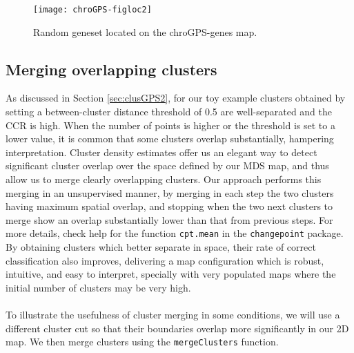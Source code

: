 \documentclass[a4paper,12pt,nogin]{article}
\newcommand{\newtext}[1]{{\color{blue} #1}} %
\begin{document}
\normalsize

\begin{figure}
\begin{center}
\texttt{[image: chroGPS-figloc2]}
 \end{center}
\caption{Random geneset located on the chroGPS-genes map.}
\label{fig:loc2}
\end{figure}

\subsection{Merging overlapping clusters}
\label{sec:clusGPS3}

\newtext{As discussed in Section \ref{sec:clusGPS2}, 
  for our toy example clusters obtained by setting a between-cluster distance threshold of 0.5 
  are well-separated and the CCR is high.
  When the number of points is higher or the threshold is set to a lower value, it is common
  that some clusters overlap substantially, hampering interpretation.}
Cluster density estimates offer
us an elegant way to detect significant cluster overlap over the space
defined by our MDS map, and thus allow us to merge clearly overlapping
clusters. Our approach performs this merging in an unsupervised
manner, by merging in each step the two clusters having maximum
spatial overlap, and stopping when the two next clusters to merge show
an overlap 
\newtext{substantially lower than that}
from previous steps. For more details, check help for the function
\texttt{cpt.mean} in the \texttt{changepoint} package. By obtaining
clusters which better separate in space, their rate of correct
classification also improves, delivering a map configuration which is
robust, intuitive, and easy to interpret, specially with very
populated maps where the initial number of clusters may be very high.
\\\\
To illustrate the usefulness of cluster merging in some conditions, we will use a different cluster cut so that their boundaries overlap more significantly in our 2D map.
\newtext{We then merge clusters using the \texttt{mergeClusters} function.}

\footnotesize
\end{document}

